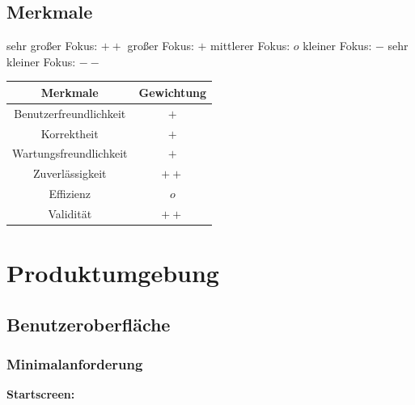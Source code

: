 \documentclass{article}
\begin{document}
\subsection{Merkmale}
sehr großer Fokus: $++$    großer Fokus: $+$    mittlerer Fokus: $o$    kleiner Fokus: $-$    sehr kleiner Fokus: $--$
\begin{center}
    \begin{tabular}{ |c|c| }
        \hline
        Merkmale & Gewichtung \\
        \hline
        Benutzerfreundlichkeit & $+$ \\
        \hline
        Korrektheit & $+$ \\
        \hline
        Wartungsfreundlichkeit & $+$ \\
        \hline
        Zuverlässigkeit & $++$ \\
        \hline
        Effizienz & $o$ \\
        \hline
        Validität & $++$ \\
        \hline
    \end{tabular}
\end{center}



\newpage
\section{Produktumgebung}\label{section-product}

\subsection{Benutzeroberfläche}

\subsubsection{Minimalanforderung}

\textbf{Startscreen:}
\begin{figure}[h]
    \centering
\end{figure}
\end{document}
